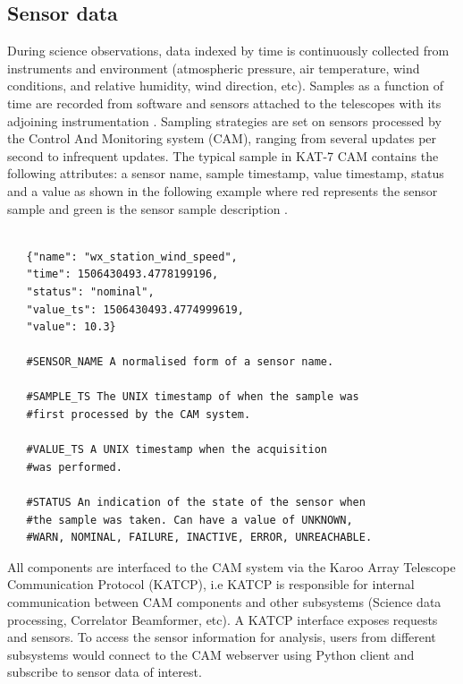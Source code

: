 \subsection{Sensor data}


During science observations, data indexed by time is continuously collected from instruments and  environment (atmospheric pressure, air temperature,  wind conditions, and relative humidity, wind direction, etc). Samples as a function of time are recorded from software and sensors attached to the telescopes with its adjoining instrumentation \citep{slabberICALEPCS2017}. Sampling strategies are set on sensors processed by the Control And Monitoring system (CAM), ranging from several updates per second to infrequent updates. The typical sample in KAT-7 CAM contains the following attributes: a sensor name, sample timestamp, value timestamp, status and a value as shown in the following example where red represents the sensor sample and green is the sensor sample description  \citep{slabber2015overview, slabber2015illustrate}. 

 

\begin{tcolorbox} 
\begin{lstlisting}

   {"name": "wx_station_wind_speed",
   "time": 1506430493.4778199196,
   "status": "nominal",
   "value_ts": 1506430493.4774999619,
   "value": 10.3}

   #SENSOR_NAME A normalised form of a sensor name.

   #SAMPLE_TS The UNIX timestamp of when the sample was
   #first processed by the CAM system.

   #VALUE_TS A UNIX timestamp when the acquisition
   #was performed. 

   #STATUS An indication of the state of the sensor when
   #the sample was taken. Can have a value of UNKNOWN,
   #WARN, NOMINAL, FAILURE, INACTIVE, ERROR, UNREACHABLE. 
\end{lstlisting}
\end{tcolorbox}

All components are interfaced to the CAM system via the Karoo Array Telescope Communication Protocol (KATCP), i.e KATCP is responsible for internal communication between CAM components and other subsystems (Science data processing, Correlator Beamformer, etc)\citep{slabber2015overview}. A KATCP interface exposes requests and sensors. To access the sensor information for analysis, users from different subsystems  would  connect to the CAM webserver using Python client and subscribe to sensor data of interest. 

